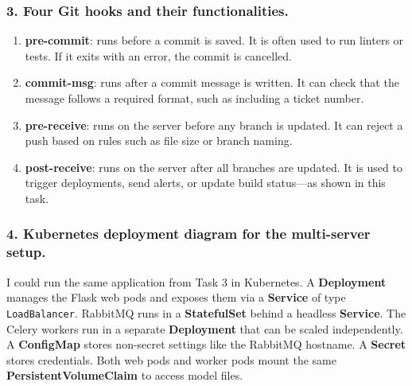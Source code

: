 \documentclass[11pt,a4paper]{article}
\begin{document}
\subsubsection*{3. Four Git hooks and their functionalities.}

\begin{enumerate}[leftmargin=1.5cm]
  \item \textbf{pre-commit}: runs before a commit is saved. It is often used to
        run linters or tests. If it exits with an error, the commit is cancelled.
  \item \textbf{commit-msg}: runs after a commit message is written. It can check
        that the message follows a required format, such as including a ticket
        number.
  \item \textbf{pre-receive}: runs on the server before any branch is updated. It
        can reject a push based on rules such as file size or branch naming.
  \item \textbf{post-receive}: runs on the server after all branches are updated.
        It is used to trigger deployments, send alerts, or update build status---as
        shown in this task.
\end{enumerate}

\subsubsection*{4. Kubernetes deployment diagram for the multi-server setup.}

I could run the same application from Task 3 in Kubernetes.
A \textbf{Deployment} manages the Flask web pods and exposes them via a
\textbf{Service} of type \texttt{LoadBalancer}.
RabbitMQ runs in a \textbf{StatefulSet} behind a headless \textbf{Service}.
The Celery workers run in a separate \textbf{Deployment} that can be scaled
independently.
A \textbf{ConfigMap} stores non-secret settings like the RabbitMQ hostname.
A \textbf{Secret} stores credentials.
Both web pods and worker pods mount the same \textbf{PersistentVolumeClaim}
to access model files.
\end{document}
